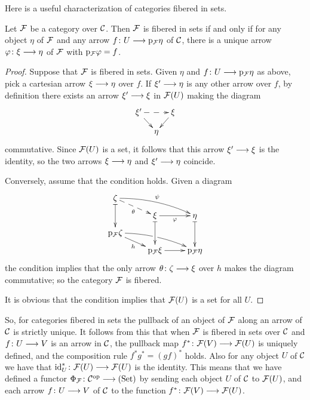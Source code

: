 \begin{3   FIBERED CATEGORIES}
\begin{3.4 Functors and cats fibered in sets}
Here is a useful characterization of categories fibered in sets.

\begin{proposition}\label{prop:characterization-fibered-sets}
Let $\mathcal{F}$ be a category over $\mathcal{C}$. Then $\mathcal{F}$ is fibered in sets if and only if for any object $\eta$ of $\mathcal{F}$ and any arrow $f \colon U \arr  \p_{\cF} \eta$ of $\mathcal{C}$, there is a unique arrow $\phi\colon \xi \arr \eta$ of $\mathcal{F}$ with $\mathrm{p}_{\mathcal{F}} \varphi = f$.
\end{proposition}

\begin{proof} Suppose that $\mathcal{F}$ is fibered in sets. Given $\eta$ and $f \colon U \arr \p_{\cF} \eta$ as above, pick a cartesian arrow $\xi \arr \eta$ over $f$. If $\xi' \arr \eta$ is any other arrow over $f$, by definition there exists an arrow $\xi' \arr \xi$ in $\mathcal{F}(U)$ making the diagram 
   \[
   \xymatrix@-15pt{{}\xi' \ar@{-->}[rr]\ar[rd] && {}\xi\ar[ld]\\
             & {}\eta \\}
   \]
commutative. Since $\mathcal{F}(U)$ is a set, it follows that this arrow $\xi' \arr \xi$ is the identity, so the two arrows $\xi\arr \eta$ and $\xi' \arr \eta$ coincide.

Conversely, assume that the condition holds. Given a diagram
   \[
   \xymatrix@R=6pt{{\zeta}\ar@{|->}[dd] \ar@{-->}[rd]_\theta
   \ar@/^/[rrd]^{\psi} \\
   & {}\xi\ar@{|->}[dd]\ar[r]_{\phi}
   &{}\eta\ar@{|->}[dd] \\
   {}\p_{\cF} \zeta\ar[rd]_h\ar@/^/[rrd]|(.487)\hole\\
   & {}\p_{\cF} \xi \ar[r]
   & {}\p_{\cF} \eta
   }
   \]
the condition implies that the only arrow $\theta\colon \zeta \arr \xi$ over $h$ makes the diagram commutative; so the category $\mathcal{F}$ is fibered.

It is obvious that the condition implies that $\mathcal{F}(U)$ is a set for all $U$.
\end{proof}


So, for categories fibered in sets the pullback of an object of $\mathcal{F}$ along an arrow of $\mathcal{C}$ is strictly unique. It follows from this that when $\mathcal{F}$ is fibered in sets over $\mathcal{C}$ and $f \colon U \arr V$ is an arrow in $\mathcal{C}$, the pullback map $f^* \colon \cF(V) \arr \cF(U)$ is uniquely defined, and the composition rule $f^*g^* = (gf)^*$ holds.  Also for any object $U$ of $\mathcal{C}$ we have that $\id_U^* \colon \cF(U) \arr \cF(U)$ is the identity. This means that we have defined a functor $\Phi_\cF \colon \cC\op \arr \catset$ by sending each object $U$ of $\mathcal{C}$ to $\mathcal{F}(U)$, and each arrow $f \colon U \arr V$ of $\mathcal{C}$ to the function $f^* \colon \cF(V) \arr \cF(U)$.


\end{3.4 Functors and cats fibered in sets}
\end{3   FIBERED CATEGORIES}

